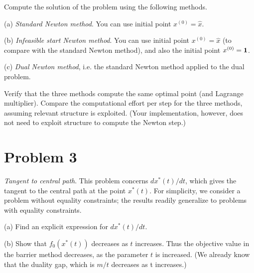 \documentclass[11pt]{article}
\begin{document}
Compute the solution of the problem using the following methods.

(a) \textit{Standard Newton method}. You can use initial point $x^{(0)} = \hat x$.

(b) \textit{Infeasible start Newton method}. You can use initial point $x^{(0)} = \hat x$ (to compare with the standard Newton method), and also the initial point $x^{(0)} = \mathbf 1$.

(c) \textit{Dual Newton method}, i.e. the standard Newton method applied to the dual problem.

Verify that the three methods compute the same optimal point (and Lagrange multiplier).
Compare the computational effort per step for the three methods, assuming relevant
structure is exploited. 
(Your implementation, however, does not need to exploit structure to compute the Newton step.)

\clearpage
\section*{Problem 3}
\textit{Tangent to central path}. This problem concerns $dx^*(t)/dt$, which gives the tangent to the central path at the point $x^*(t)$. For simplicity, we consider a problem without equality constraints; the results readily generalize to problems with equality constraints.

(a) Find an explicit expression for $dx^*(t)/dt$.

(b) Show that $f_0(x^*(t))$ decreases as $t$ increases. Thus the objective value in the barrier method decreases, as the parameter $t$ is increased. (We already know that the duality gap, which is $m/t$ decreases as t increases.)
\end{document}
